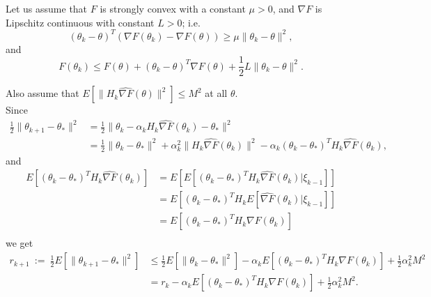 \documentclass{article}
\begin{document}
Let us assume that $F$ is strongly convex with a constant $\mu>0$, and $\nabla F$ is Lipschitz continuous with constant $L>0$; i.e.
\begin{equation}
(\theta_k - \theta)^T(\nabla F(\theta_k) - \nabla F(\theta)) \geq \mu\|\theta_k-\theta\|^2,
\label{eq:nest1}
\end{equation}
and
\begin{equation}
 F(\theta_k) \leq F(\theta) + (\theta_k-\theta)^T\nabla F(\theta) + \frac{1}{2}L\|\theta_k-\theta\|^2 .
\label{eq:nest2}
\end{equation}

\noindent
Also assume that $E [\| H_k \hat{\nabla F}(\theta)\|^2  ] \leq M^2$ at all $\theta$.\\  
Since
\begin{align*}
 \frac{1}{2}\|\theta_{k+1}-\theta_\ast\|^2 &= \frac{1}{2}\|\theta_k-\alpha_k H_k \hat{\nabla F}(\theta_k)-\theta_\ast\|^2\\
 &=\frac{1}{2}\|\theta_k-\theta_\ast\|^2 + \alpha_k^2\|H_k\hat{\nabla F}(\theta_k)\|^2 -\alpha_k(\theta_k-\theta_\ast)^T H_k\hat{\nabla F}(\theta_k),
\end{align*}
and
\begin{align*}
 E[(\theta_k-\theta_\ast)^T H_k\hat{\nabla F}(\theta_k)] &= E[E[(\theta_k-\theta_\ast)^T H_k\hat{\nabla F}(\theta_k) | \xi_{k-1}]]\\
 &= E[(\theta_k-\theta_\ast)^T H_kE[\hat{\nabla F}(\theta_k) | \xi_{k-1}]]\\
 &= E[(\theta_k-\theta_\ast)^T H_k{\nabla F}(\theta_k)]\\
\end{align*}
we get 
\begin{align*}
 r_{k+1} \ := \ \frac{1}{2}E[\|\theta_{k+1}-\theta_\ast\|^2] & \leq  \frac{1}{2}E[\|\theta_k-\theta_\ast\|^2] -\alpha_k E[(\theta_k-\theta_\ast)^T H_k\nabla F(\theta_k)] + \frac{1}{2}\alpha_k^2M^2 \\
  &= r_k -\alpha_k E[(\theta_k-\theta_\ast)^T  H_k \nabla F(\theta_k)] + \frac{1}{2}\alpha_k^2M^2.
\end{align*}
\end{document}
